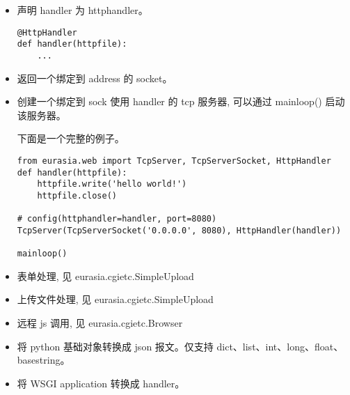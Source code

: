 \documentclass{manual}
\begin{document}
\begin{itemize}

\item {}

声明 handler 为 httphandler。

\begin{verbatim}
@HttpHandler
def handler(httpfile):
	...
\end{verbatim}

\item {}

返回一个绑定到  address 的 socket。

\item {}

创建一个绑定到 sock 使用 handler 的 tcp 服务器, 可以通过 mainloop() 启动该服务器。

下面是一个完整的例子。

\begin{verbatim}
from eurasia.web import TcpServer, TcpServerSocket, HttpHandler
def handler(httpfile):
	httpfile.write('hello world!')
	httpfile.close()

# config(httphandler=handler, port=8080)
TcpServer(TcpServerSocket('0.0.0.0', 8080), HttpHandler(handler))

mainloop()
\end{verbatim}

\item {}

表单处理, 见 eurasia.cgietc.SimpleUpload

\item {}

上传文件处理, 见 eurasia.cgietc.SimpleUpload

\item {}

远程 js 调用, 见 eurasia.cgietc.Browser

\item {}

将 python 基础对象转换成 json 报文。仅支持 dict、list、int、long、float、basestring。


\item {}

将 WSGI application 转换成 handler。

\end{itemize}
\end{document}
